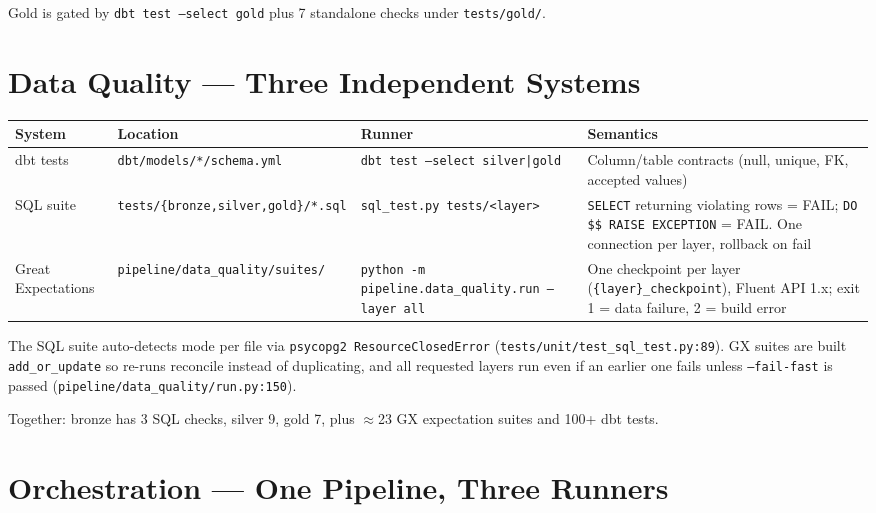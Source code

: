 \documentclass[11pt,a4paper]{article}
\begin{document}
Gold is gated by \texttt{dbt test --select gold} plus 7 standalone checks under \texttt{tests/gold/}.

\section{Data Quality — Three Independent Systems}

\begin{center}
\begin{longtable}{l l l p{5.8cm}}
\toprule
System & Location & Runner & Semantics \\
\midrule
\endhead
dbt tests & \texttt{dbt/models/*/schema.yml} & \texttt{dbt test --select silver|gold} & Column/table contracts (null, unique, FK, accepted values) \\
SQL suite & \texttt{tests/\{bronze,silver,gold\}/*.sql} & \texttt{sql\_test.py tests/<layer>} & \texttt{SELECT} returning violating rows = FAIL; \texttt{DO \$\$ RAISE EXCEPTION} = FAIL. One connection per layer, rollback on fail \\
Great Expectations & \texttt{pipeline/data\_quality/suites/} & \texttt{python -m pipeline.data\_quality.run --layer all} & One checkpoint per layer (\texttt{\{layer\}\_checkpoint}), Fluent API 1.x; exit 1 = data failure, 2 = build error \\
\bottomrule
\end{longtable}
\end{center}

The SQL suite auto-detects mode per file via \texttt{psycopg2 ResourceClosedError} (\texttt{tests/unit/test\_sql\_test.py:89}). GX suites are built \texttt{add\_or\_update} so re-runs reconcile instead of duplicating, and all requested layers run even if an earlier one fails unless \texttt{--fail-fast} is passed (\texttt{pipeline/data\_quality/run.py:150}).

Together: bronze has 3 SQL checks, silver 9, gold 7, plus $\approx$23 GX expectation suites and 100+ dbt tests.

\section{Orchestration — One Pipeline, Three Runners}
\end{document}
